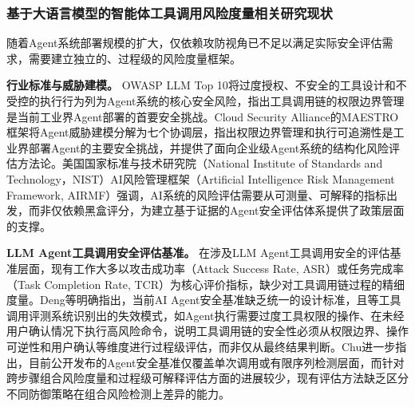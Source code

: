 \subsubsection{基于大语言模型的智能体工具调用风险度量相关研究现状}

随着Agent系统部署规模的扩大，仅依赖攻防视角已不足以满足实际安全评估需求，需要建立独立的、过程级的风险度量框架。

\textbf{行业标准与威胁建模。}
OWASP LLM Top 10\cite{owasp2025llmtop10}将过度授权、不安全的工具设计和不受控的执行行为列为Agent系统的核心安全风险，指出工具调用链的权限边界管理是当前工业界Agent部署的首要安全挑战。Cloud Security Alliance的MAESTRO框架\cite{huang2025maestro}将Agent威胁建模分解为七个协调层，指出权限边界管理和执行可追溯性是工业界部署Agent的主要安全挑战，并提供了面向企业级Agent系统的结构化风险评估方法论。美国国家标准与技术研究院（National Institute of Standards and Technology，NIST）AI风险管理框架（Artificial Intelligence Risk Management Framework, AIRMF）\cite{nist2023airmf}强调，AI系统的风险评估需要从可测量、可解释的指标出发，而非仅依赖黑盒评分，为建立基于证据的Agent安全评估体系提供了政策层面的支撑。

\textbf{LLM Agent工具调用安全评估基准。}
在涉及LLM Agent工具调用安全的评估基准层面，现有工作大多以攻击成功率（Attack Success Rate, ASR）或任务完成率（Task Completion Rate, TCR）为核心评价指标，缺少对工具调用链过程的精细度量。Deng等\cite{deng2025agentsunderthreat}明确指出，当前AI Agent安全基准缺乏统一的设计标准，且\cite{ruan2024toolemu}等工具调用评测系统识别出的失效模式，如Agent执行需要过度工具权限的操作、在未经用户确认情况下执行高风险命令，说明工具调用链的安全性必须从权限边界、操作可逆性和用户确认等维度进行过程级评估，而非仅从最终结果判断。Chu\cite{chu2026systematic}进一步指出，目前公开发布的Agent安全基准仅覆盖单次调用或有限序列检测层面，而针对跨步骤组合风险度量和过程级可解释评估方面的进展较少，现有评估方法缺乏区分不同防御策略在组合风险检测上差异的能力。

